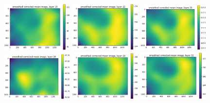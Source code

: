\documentclass[letterpaper,11pt]{article}
\begin{document}
\begin{figure}[!ht]
\includegraphics[width=0.32\textwidth]{images/results/smoothed_corrected_mean_image_layers/smoothed_corrected_mean_image_layer_19}
\includegraphics[width=0.32\textwidth]{images/results/smoothed_corrected_mean_image_layers/smoothed_corrected_mean_image_layer_22}
\includegraphics[width=0.32\textwidth]{images/results/smoothed_corrected_mean_image_layers/smoothed_corrected_mean_image_layer_25}
\includegraphics[width=0.32\textwidth]{images/results/smoothed_corrected_mean_image_layers/smoothed_corrected_mean_image_layer_26}
\includegraphics[width=0.32\textwidth]{images/results/smoothed_corrected_mean_image_layers/smoothed_corrected_mean_image_layer_29}
\includegraphics[width=0.32\textwidth]{images/results/smoothed_corrected_mean_image_layers/smoothed_corrected_mean_image_layer_32}

\end{figure}
\end{document}
